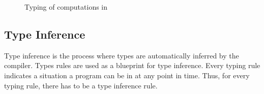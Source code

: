 \begin{figure}[H]
  \begin{center}
\end{center}
\caption{Typing of computations in \eff}\label{fig:eff-typing:c}
\end{figure}

\subsection{Type Inference}\label{type-inference-explain}
Type inference is the process where types are automatically inferred by the compiler. Types rules are used as a blueprint for type inference. Every typing rule indicates a situation a program can be in at any point in time. Thus, for every typing rule, there has to be a type inference rule. 

